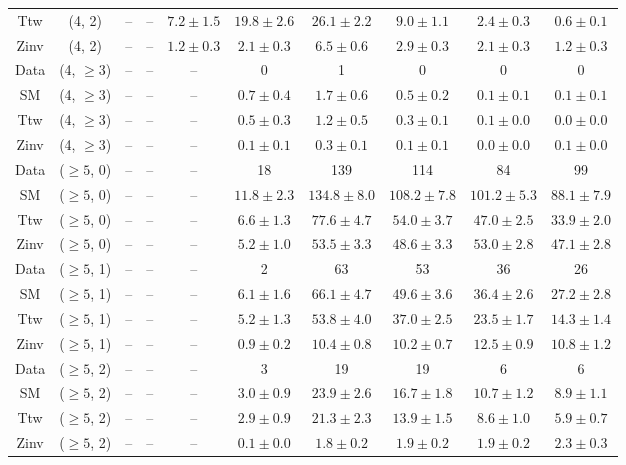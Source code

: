 \begin{table}[h!]
{\begin{tabular}{cccccccccc}
	Ttw & (4, 2) & -- & -- & $7.2\pm 1.5$ & $19.8\pm 2.6$ & $26.1\pm 2.2$ & $9.0\pm 1.1$ & $2.4\pm 0.3$ & $0.6\pm 0.1$ \\[0.5ex] 
	Zinv & (4, 2) & -- & -- & $1.2\pm 0.3$ & $2.1\pm 0.3$ & $6.5\pm 0.6$ & $2.9\pm 0.3$ & $2.1\pm 0.3$ & $1.2\pm 0.3$ \\[0.5ex] 
	Data & (4, $\ge3$) & -- & -- & -- & 0 & 1 & 0 & 0 & 0 \\[0.5ex] 
	SM & (4, $\ge3$) & -- & -- & -- & $0.7\pm 0.4$ & $1.7\pm 0.6$ & $0.5\pm 0.2$ & $0.1\pm 0.1$ & $0.1\pm 0.1$ \\[0.5ex] 
	Ttw & (4, $\ge3$) & -- & -- & -- & $0.5\pm 0.3$ & $1.2\pm 0.5$ & $0.3\pm 0.1$ & $0.1\pm 0.0$ & $0.0\pm 0.0$ \\[0.5ex] 
	Zinv & (4, $\ge3$) & -- & -- & -- & $0.1\pm 0.1$ & $0.3\pm 0.1$ & $0.1\pm 0.1$ & $0.0\pm 0.0$ & $0.1\pm 0.0$ \\[0.5ex] 
	Data & ($\ge5$, 0) & -- & -- & -- & 18 & 139 & 114 & 84 & 99 \\[0.5ex] 
	SM & ($\ge5$, 0) & -- & -- & -- & $11.8\pm 2.3$ & $134.8\pm 8.0$ & $108.2\pm 7.8$ & $101.2\pm 5.3$ & $88.1\pm 7.9$ \\[0.5ex] 
	Ttw & ($\ge5$, 0) & -- & -- & -- & $6.6\pm 1.3$ & $77.6\pm 4.7$ & $54.0\pm 3.7$ & $47.0\pm 2.5$ & $33.9\pm 2.0$ \\[0.5ex] 
	Zinv & ($\ge5$, 0) & -- & -- & -- & $5.2\pm 1.0$ & $53.5\pm 3.3$ & $48.6\pm 3.3$ & $53.0\pm 2.8$ & $47.1\pm 2.8$ \\[0.5ex] 
	Data & ($\ge5$, 1) & -- & -- & -- & 2 & 63 & 53 & 36 & 26 \\[0.5ex] 
	SM & ($\ge5$, 1) & -- & -- & -- & $6.1\pm 1.6$ & $66.1\pm 4.7$ & $49.6\pm 3.6$ & $36.4\pm 2.6$ & $27.2\pm 2.8$ \\[0.5ex] 
	Ttw & ($\ge5$, 1) & -- & -- & -- & $5.2\pm 1.3$ & $53.8\pm 4.0$ & $37.0\pm 2.5$ & $23.5\pm 1.7$ & $14.3\pm 1.4$ \\[0.5ex] 
	Zinv & ($\ge5$, 1) & -- & -- & -- & $0.9\pm 0.2$ & $10.4\pm 0.8$ & $10.2\pm 0.7$ & $12.5\pm 0.9$ & $10.8\pm 1.2$ \\[0.5ex] 
	Data & ($\ge5$, 2) & -- & -- & -- & 3 & 19 & 19 & 6 & 6 \\[0.5ex] 
	SM & ($\ge5$, 2) & -- & -- & -- & $3.0\pm 0.9$ & $23.9\pm 2.6$ & $16.7\pm 1.8$ & $10.7\pm 1.2$ & $8.9\pm 1.1$ \\[0.5ex] 
	Ttw & ($\ge5$, 2) & -- & -- & -- & $2.9\pm 0.9$ & $21.3\pm 2.3$ & $13.9\pm 1.5$ & $8.6\pm 1.0$ & $5.9\pm 0.7$ \\[0.5ex] 
	Zinv & ($\ge5$, 2) & -- & -- & -- & $0.1\pm 0.0$ & $1.8\pm 0.2$ & $1.9\pm 0.2$ & $1.9\pm 0.2$ & $2.3\pm 0.3$ \\[0.5ex] 

\end{tabular}}
\end{table}
